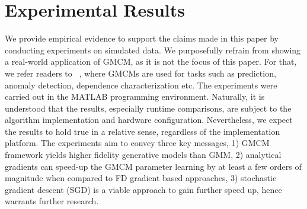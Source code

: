 \documentclass[]{article}
\begin{document}
\section{Experimental Results}\label{sec:Experimental}

We provide empirical evidence to support the claims made in this paper by conducting experiments on simulated data. We purposefully refrain from showing a real-world application of GMCM, as it is not the focus of this paper. For that, we refer readers to ~\cite{Bilgrau2012quantification,Wang2014,Yu2013GMCMWindPred}, where GMCMs are used for tasks such as prediction, anomaly detection, dependence characterization etc. The experiments were carried out in the MATLAB programming environment. Naturally, it is understood that the results, especially runtime comparisons, are subject to the algorithm implementation and hardware configuration. Nevertheless, we expect the results to hold true in a relative sense, regardless of the implementation platform.  The experiments aim to convey three key messages, 1) GMCM framework yields higher fidelity generative models than GMM, 2) analytical gradients can speed-up the GMCM parameter learning by at least a few orders of magnitude when compared to FD gradient based approaches, 3) stochastic gradient descent (SGD) is a viable approach to gain further speed up, hence warrants further research.
\end{document}
